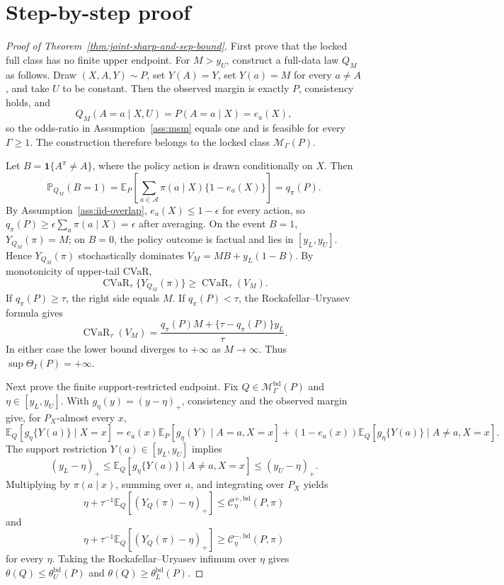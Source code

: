 \documentclass[11pt]{article}
\newcommand{\E}{\mathbb{E}}
\renewcommand{\Pr}{\mathbb{P}}
\newcommand{\one}{\mathbf{1}}
\theoremstyle{definition}
\theoremstyle{plain}
\theoremstyle{remark}
\begin{document}
\section{Step-by-step proof}
\begin{proof}[Proof of Theorem~\ref{thm:joint-sharp-and-sep-bound}]
First prove that the locked full class has no finite upper endpoint.  For
\(M>y_U\), construct a full-data law \(Q_M\) as follows.  Draw
\((X,A,Y)\sim P\), set \(Y(A)=Y\), set \(Y(a)=M\) for every \(a\ne A\), and take
\(U\) to be constant.  Then the observed margin is exactly \(P\), consistency
holds, and
\[
Q_M(A=a\mid X,U)=P(A=a\mid X)=e_a(X),
\]
so the odds-ratio in Assumption~\ref{ass:msm} equals one and is feasible for
every \(\Gamma\ge1\).  The construction therefore belongs to the locked class
\(\mathcal M_\Gamma(P)\).

Let \(B=\one\{A^\pi\ne A\}\), where the policy action is drawn conditionally on
\(X\).  Then
\[
\Pr_{Q_M}(B=1)
=
\E_P\left[\sum_{a\in\mathcal A}\pi(a\mid X)\{1-e_a(X)\}\right]
=
q_\pi(P).
\]
By Assumption~\ref{ass:iid-overlap}, \(e_a(X)\le1-\epsilon\) for every action,
so \(q_\pi(P)\ge\epsilon\sum_a\pi(a\mid X)=\epsilon\) after averaging.  On the
event \(B=1\), \(Y_{Q_M}(\pi)=M\); on \(B=0\), the policy outcome is factual and
lies in \([y_L,y_U]\).  Hence \(Y_{Q_M}(\pi)\) stochastically dominates
\(V_M=M B+y_L(1-B)\).  By monotonicity of upper-tail CVaR,
\[
\operatorname{CVaR}_\tau\{Y_{Q_M}(\pi)\}
\ge
\operatorname{CVaR}_\tau(V_M).
\]
If \(q_\pi(P)\ge\tau\), the right side equals \(M\).  If
\(q_\pi(P)<\tau\), the Rockafellar--Uryasev formula gives
\[
\operatorname{CVaR}_\tau(V_M)
=
\frac{q_\pi(P)M+\{\tau-q_\pi(P)\}y_L}{\tau}.
\]
In either case the lower bound diverges to \(+\infty\) as \(M\to\infty\).
Thus \(\sup\Theta_I(P)=+\infty\).

Next prove the finite support-restricted endpoint.  Fix
\(Q\in\mathcal M_\Gamma^{\mathrm{bd}}(P)\) and
\(\eta\in[y_L,y_U]\).  With \(g_\eta(y)=(y-\eta)_+\), consistency and the
observed margin give, for \(P_X\)-almost every \(x\),
\[
\E_Q[g_\eta\{Y(a)\}\mid X=x]
=
e_a(x)\E_P[g_\eta(Y)\mid A=a,X=x]
+
(1-e_a(x))\E_Q[g_\eta\{Y(a)\}\mid A\ne a,X=x].
\]
The support restriction \(Y(a)\in[y_L,y_U]\) implies
\[
(y_L-\eta)_+\le
\E_Q[g_\eta\{Y(a)\}\mid A\ne a,X=x]
\le
(y_U-\eta)_+.
\]
Multiplying by \(\pi(a\mid x)\), summing over \(a\), and integrating over
\(P_X\) yields
\[
\eta+\tau^{-1}\E_Q[(Y_Q(\pi)-\eta)_+]
\le
\mathcal C_\eta^{+,\mathrm{bd}}(P,\pi)
\]
and
\[
\eta+\tau^{-1}\E_Q[(Y_Q(\pi)-\eta)_+]
\ge
\mathcal C_\eta^{-,\mathrm{bd}}(P,\pi)
\]
for every \(\eta\).  Taking the Rockafellar--Uryasev infimum over \(\eta\)
gives \(\theta(Q)\le\theta_U^{\mathrm{bd}}(P)\) and
\(\theta(Q)\ge\theta_L^{\mathrm{bd}}(P)\).


\end{proof}
\end{document}
